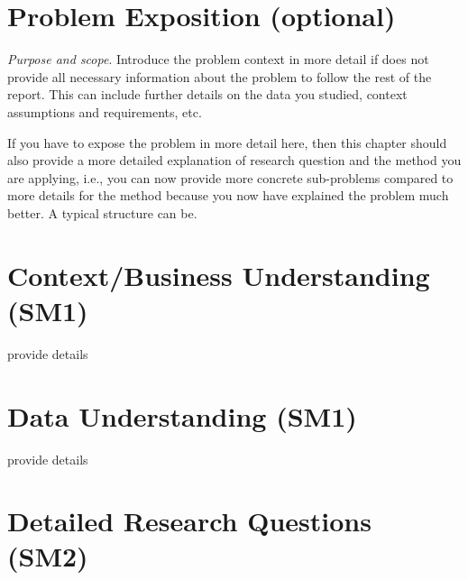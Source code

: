 \section{Problem Exposition (optional)}\label{sec:problem-exposition}

\emph{Purpose and scope}.
Introduce the problem context in more detail if  does not provide all necessary information about the problem to follow the rest of the report.
This can include further details on the data you studied, context assumptions and requirements, etc.

If you have to expose the problem in more detail here, then this chapter should also provide a more detailed explanation of research question and the method you are applying, i.e., you can now provide more concrete sub-problems compared to  more details for the method  because you now have explained the problem much better.
A typical structure can be.

\section{Context/Business Understanding (SM1)}\label{sec:problem-exposition:context-understanding}

provide details

\section{Data Understanding (SM1)}\label{sec:problem-exposition:data-understanding}

provide details

\section{Detailed Research Questions (SM2)}\label{sec:problem-exposition:research-problems}

